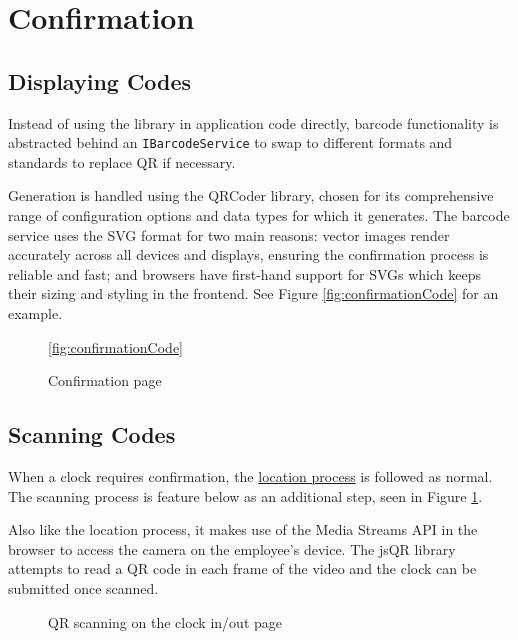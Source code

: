 \section{Confirmation}

\subsection{Displaying Codes}

Instead of using the library in application code directly,
barcode functionality is abstracted behind an
\lstinline{IBarcodeService} to swap to different formats
and standards to replace QR if necessary.

Generation is handled using the QRCoder library, chosen for
its comprehensive range of configuration options and data
types for which it generates.
The barcode service uses the SVG format for two main
reasons: vector images render accurately across all devices
and displays, ensuring the confirmation process is reliable
and fast; and browsers have first-hand support for SVGs
which keeps their sizing and styling in the frontend.
See Figure \ref{fig:confirmationCode} for an example.

\begin{figure}[h]
  \centering
  \caption{Confirmation page}
  \ref{fig:confirmationCode}
\end{figure}

\subsection{Scanning Codes}

When a clock requires confirmation, the
\hyperref[s:providingLocation]{location process} is
followed as normal.
The scanning process is feature below as an additional
step, seen in Figure \ref{fig:scanCode}.

Also like the location process, it makes use of the Media
Streams API in the browser to access the camera on the
employee's device.
The jsQR library attempts to read a QR code in each frame
of the video and the clock can be submitted once scanned.

\begin{figure}[h]
  \centering
  \caption{QR scanning on the clock in/out page}
  \label{fig:scanCode}
\end{figure}